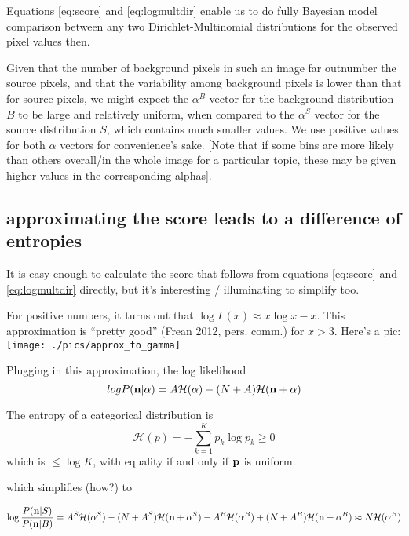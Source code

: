 \documentclass[11pt]{article}
\begin{document}
Equations \ref{eq:score} and \ref{eq:logmultdir} enable us to do
fully Bayesian model comparison between any two Dirichlet-Multinomial
distributions for the observed pixel values then.


Given that the number of background pixels in such an image far
outnumber the source pixels, and that the variability among background
pixels is lower than that for source pixels, we might expect the
$\alpha^B$ vector for the background distribution $B$ to be large and
relatively uniform, when compared to the $\alpha^S$ vector for the
source distribution $S$, which contains much smaller values. We use
positive values for both $\alpha$ vectors for convenience's
sake. [Note that if some bins are more likely than others overall/in
  the whole image for a particular topic, these may be given higher
  values in the corresponding alphas].

\subsection{approximating the score leads to a difference of entropies}

It is easy enough to calculate the score that follows from equations
\ref{eq:score} and \ref{eq:logmultdir} directly, but it's interesting
/ illuminating to simplify too.

For positive numbers, it turns out that $\log \Gamma(x) \approx x \log
x - x $.  This approximation is ``pretty good'' (Frean 2012,
pers. comm.) for $x>3$. Here's a pic:
\\ \texttt{[image: ./pics/approx\_to\_gamma]}

Plugging in this approximation, the log likelihood
\begin{equation}
log P(\mathbf{n}|\alpha) = A \mathcal{H}(\alpha) - (N+A)\mathcal{H}(\mathbf{n}+\alpha)
\end{equation}

The entropy  of a categorical distribution is
\begin{equation}
\mathcal{H}(p) = - \sum_{k=1}^K p_k \log p_k \geq 0
\end{equation}
which is $\leq \log K$, with equality if and only if $\mathbf{p}$ is uniform.

which simplifies (how?) to

\begin{equation}
\log \frac{P(\mathbf{n}|S)}{P(\mathbf{n}|B)} = A^S\mathcal{H}(\alpha^S) - (N+A^S)\mathcal{H}(\mathbf{n}+\alpha^S) - A^B\mathcal{H}(\alpha^B) + (N+A^B)\mathcal{H}(\mathbf{n}+\alpha^B) \approx N\mathcal{H}(\alpha^B)
\label{eq:approxscore}
\end{equation}
\end{document}
